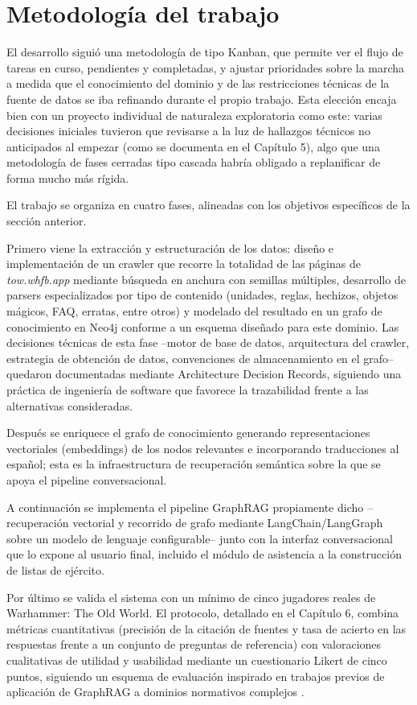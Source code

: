 \documentclass[11pt,a4paper,spanish]{book}
\numberwithin{equation}{chapter}
\numberwithin{figure}{chapter}
\numberwithin{table}{chapter}
\begin{document}
\section{Metodología del trabajo}

El desarrollo siguió una metodología de tipo Kanban, que permite ver el flujo de tareas en curso, pendientes y completadas, y ajustar prioridades sobre la marcha a medida que el conocimiento del dominio y de las restricciones técnicas de la fuente de datos se iba refinando durante el propio trabajo. Esta elección encaja bien con un proyecto individual de naturaleza exploratoria como este: varias decisiones iniciales tuvieron que revisarse a la luz de hallazgos técnicos no anticipados al empezar (como se documenta en el Capítulo 5), algo que una metodología de fases cerradas tipo cascada habría obligado a replanificar de forma mucho más rígida.

El trabajo se organiza en cuatro fases, alineadas con los objetivos específicos de la sección anterior.

Primero viene la extracción y estructuración de los datos: diseño e implementación de un crawler que recorre la totalidad de las páginas de \emph{tow.whfb.app} mediante búsqueda en anchura con semillas múltiples, desarrollo de parsers especializados por tipo de contenido (unidades, reglas, hechizos, objetos mágicos, FAQ, erratas, entre otros) y modelado del resultado en un grafo de conocimiento en Neo4j conforme a un esquema diseñado para este dominio. Las decisiones técnicas de esta fase --motor de base de datos, arquitectura del crawler, estrategia de obtención de datos, convenciones de almacenamiento en el grafo-- quedaron documentadas mediante Architecture Decision Records, siguiendo una práctica de ingeniería de software que favorece la trazabilidad frente a las alternativas consideradas.

Después se enriquece el grafo de conocimiento generando representaciones vectoriales (embeddings) de los nodos relevantes e incorporando traducciones al español; esta es la infraestructura de recuperación semántica sobre la que se apoya el pipeline conversacional.

A continuación se implementa el pipeline GraphRAG propiamente dicho --recuperación vectorial y recorrido de grafo mediante LangChain/LangGraph sobre un modelo de lenguaje configurable-- junto con la interfaz conversacional que lo expone al usuario final, incluido el módulo de asistencia a la construcción de listas de ejército.

Por último se valida el sistema con un mínimo de cinco jugadores reales de Warhammer: The Old World. El protocolo, detallado en el Capítulo 6, combina métricas cuantitativas (precisión de la citación de fuentes y tasa de acierto en las respuestas frente a un conjunto de preguntas de referencia) con valoraciones cualitativas de utilidad y usabilidad mediante un cuestionario Likert de cinco puntos, siguiendo un esquema de evaluación inspirado en trabajos previos de aplicación de GraphRAG a dominios normativos complejos \cite{bifrostrag2025}.
\end{document}
